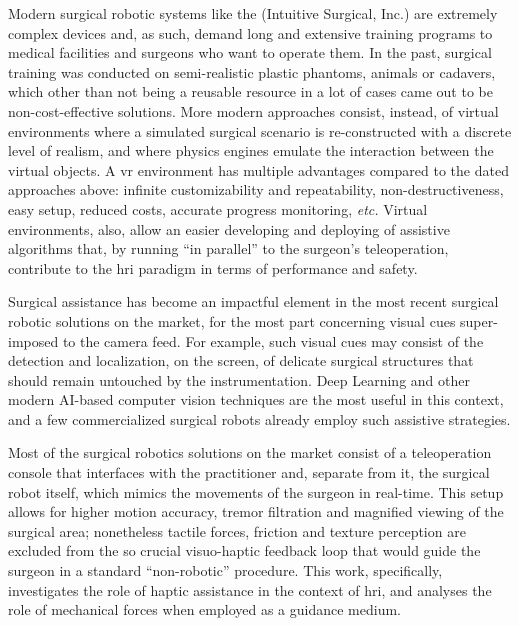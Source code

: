 \documentclass[../main.tex]{subfiles}
\begin{document}
Modern surgical robotic systems like the \davinci (Intuitive Surgical, Inc.) are extremely complex devices and, as such, demand long and extensive training programs to medical facilities and surgeons who want to operate them. In the past, surgical training was conducted on semi-realistic plastic phantoms, animals or cadavers, which other than not being a reusable resource in a lot of cases came out to be non-cost-effective solutions. More modern approaches consist, instead, of virtual environments where a simulated surgical scenario is re-constructed with a discrete level of realism, and where physics engines emulate the interaction between the virtual objects. A \ac{vr} environment has multiple advantages compared to the dated approaches above: infinite customizability and repeatability, non-destructiveness, easy setup, reduced costs, accurate progress monitoring, \textit{etc.} Virtual environments, also, allow an easier developing and deploying of assistive algorithms that, by running ``in parallel'' to the surgeon's teleoperation, contribute to the \ac{hri} paradigm in terms of performance and safety. 

Surgical assistance has become an impactful element in the most recent surgical robotic solutions on the market, for the most part concerning visual cues super-imposed to the camera feed. For example, such visual cues may consist of the detection and localization, on the screen, of delicate surgical structures that should remain untouched by the instrumentation. Deep Learning and other modern AI-based computer vision techniques are the most useful in this context, and a few commercialized surgical robots already employ such assistive strategies.

Most of the surgical robotics solutions on the market consist of a teleoperation console that interfaces with the practitioner and, separate from it, the surgical robot itself, which mimics the movements of the surgeon in real-time. This setup allows for higher motion accuracy, tremor filtration and magnified viewing of the surgical area; nonetheless tactile forces, friction and texture perception are excluded from the so crucial visuo-haptic feedback loop that would guide the surgeon in a standard ``non-robotic'' procedure. This work, specifically, investigates the role of haptic assistance in the context of \ac{hri}, and analyses the role of mechanical forces when employed as a guidance medium.
\end{document}
